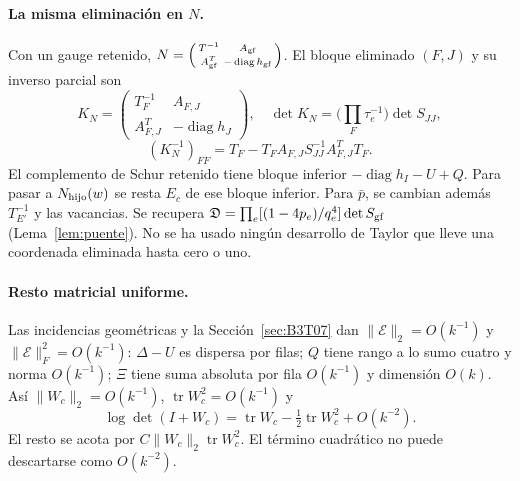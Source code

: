 \paragraph{La misma eliminación en $N$.}
Con un gauge retenido, $N=\left(\begin{smallmatrix}T^{-1}&A_{\rm gf}\\
A_{\rm gf}^T&-\operatorname{diag}h_{\rm gf}\end{smallmatrix}\right)$.
El bloque eliminado $(F,J)$ y su inverso parcial son
\[
 K_N=\begin{pmatrix}T_F^{-1}&A_{F,J}\\A_{F,J}^T&-\operatorname{diag}h_J\end{pmatrix},
 \quad \det K_N=\Big(\prod_F\tau_e^{-1}\Big)\det S_{JJ},
\]
\[
 (K_N^{-1})_{FF}=T_F-T_FA_{F,J}S_{JJ}^{-1}A_{F,J}^TT_F.
\]
El complemento de Schur retenido tiene bloque inferior $-\operatorname{diag}h_I-U+Q$.
Para pasar a $N_{\rm hijo}(w)$ se resta $E_c$ de ese bloque inferior.
Para $\bar p$, se cambian además $T_{E'}^{-1}$ y las vacancias.
Se recupera $\mathfrak D=\prod_e[(1-4p_e)/q_e^4]\det S_{\rm gf}$ (Lema~\ref{lem:puente}).
No se ha usado ningún desarrollo de Taylor que lleve una coordenada eliminada hasta cero o uno.

\paragraph{Resto matricial uniforme.}
Las incidencias geométricas y la Sección~\ref{sec:B3T07} dan
$\|\mathcal E\|_2=O(k^{-1})$ y $\|\mathcal E\|_F^2=O(k^{-1})$:
$\Delta-U$ es dispersa por filas; $Q$ tiene rango a lo sumo cuatro y norma $O(k^{-1})$;
$\Xi$ tiene suma absoluta por fila $O(k^{-1})$ y dimensión $O(k)$.
Así $\|W_c\|_2=O(k^{-1})$, $\operatorname{tr}W_c^2=O(k^{-1})$ y
\[
 \boxed{\log\det(I+W_c)=\operatorname{tr}W_c
       -\tfrac12\operatorname{tr}W_c^2+O(k^{-2}).}
\]
El resto se acota por $C\|W_c\|_2\operatorname{tr}W_c^2$.
El término cuadrático no puede descartarse como $O(k^{-2})$.
